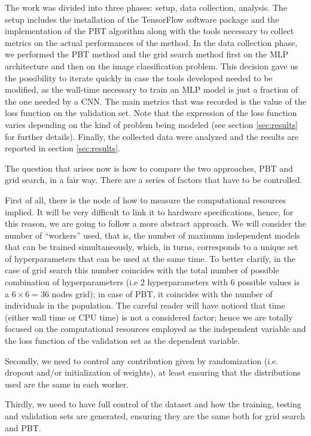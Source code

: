 \documentclass{article}
\begin{document}
The work was divided into three phases: setup, data collection, analysis.
The setup includes the installation of the TensorFlow software package and the implementation of the PBT algorithm along with the tools necessary to collect metrics on the actual performances of the method.
In the data collection phase, we performed the PBT method and the grid search method first on the MLP architecture and then on the image classification problem. This decision gave us the possibility to iterate quickly in case the tools developed needed to be modified, as the wall-time necessary to train an MLP model is just a fraction of the one needed by a CNN. The main metrics that was recorded is the value of the loss function on the validation set. Note that the expression of the loss function varies depending on the kind of problem being modeled (see section \ref{sec:results} for further details).
Finally, the collected data were analyzed and the results are reported in section \ref{sec:results}.

The question that arises now is how to compare the two approaches, PBT and grid search, in a fair way. There are a series of factors that have to be controlled. 

First of all, there is the node of how to measure the computational resources implied. It will be very difficult to link it to hardware specifications, hence, for this reason, we are going to follow a more abstract approach. We will consider the number of “workers” used, that is, the number of maximum independent models that can be trained simultaneously, which, in turns, corresponds to a unique set of hyperparameters that can be used at the same time. To better clarify, in the case of grid search this number coincides with the total number of possible combination of hyperparameters (i.e 2 hyperparameters with 6 possible values is a $6 \times 6 = 36$ nodes grid); in case of PBT, it coincides with the number of individuals in the population. The careful reader will have noticed that time (either wall time or CPU time) is not a considered factor; hence we are totally focused on the computational resources employed as the independent variable and the loss function of the validation set as the dependent variable.

Secondly, we need to control any contribution given by randomization (i.e. dropout and/or initialization of weights), at least ensuring that the distributions used are the same in each worker. 

Thirdly, we need to have full control of the dataset and how the training, testing and validation sets are generated, ensuring they are the same both for grid search and PBT.
\end{document}
